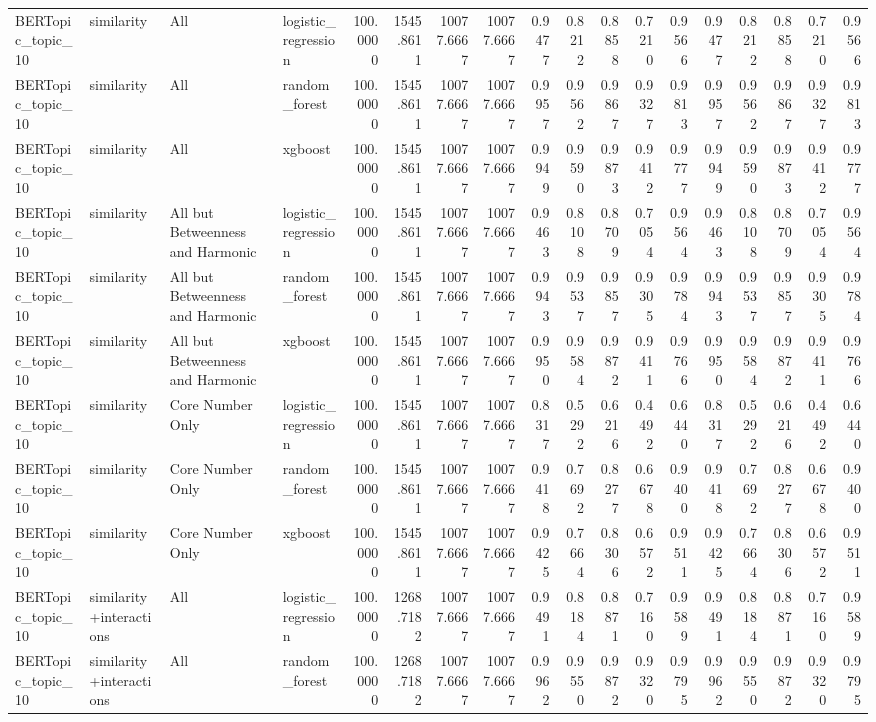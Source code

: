 \begin{tabular}{llllrrrrrrrrrrrrrr}
BERTopic_topic_10 & similarity & All & logistic_regression & 100.0000 & 1545.8611 & 10077.6667 & 10077.6667 & 0.9477 & 0.8212 & 0.8858 & 0.7210 & 0.9566 & 0.9477 & 0.8212 & 0.8858 & 0.7210 & 0.9566 \\
BERTopic_topic_10 & similarity & All & random_forest & 100.0000 & 1545.8611 & 10077.6667 & 10077.6667 & 0.9957 & 0.9562 & 0.9867 & 0.9327 & 0.9813 & 0.9957 & 0.9562 & 0.9867 & 0.9327 & 0.9813 \\
BERTopic_topic_10 & similarity & All & xgboost & 100.0000 & 1545.8611 & 10077.6667 & 10077.6667 & 0.9949 & 0.9590 & 0.9873 & 0.9412 & 0.9777 & 0.9949 & 0.9590 & 0.9873 & 0.9412 & 0.9777 \\
BERTopic_topic_10 & similarity & All but Betweenness and Harmonic & logistic_regression & 100.0000 & 1545.8611 & 10077.6667 & 10077.6667 & 0.9463 & 0.8108 & 0.8709 & 0.7054 & 0.9564 & 0.9463 & 0.8108 & 0.8709 & 0.7054 & 0.9564 \\
BERTopic_topic_10 & similarity & All but Betweenness and Harmonic & random_forest & 100.0000 & 1545.8611 & 10077.6667 & 10077.6667 & 0.9943 & 0.9537 & 0.9857 & 0.9305 & 0.9784 & 0.9943 & 0.9537 & 0.9857 & 0.9305 & 0.9784 \\
BERTopic_topic_10 & similarity & All but Betweenness and Harmonic & xgboost & 100.0000 & 1545.8611 & 10077.6667 & 10077.6667 & 0.9950 & 0.9584 & 0.9872 & 0.9411 & 0.9766 & 0.9950 & 0.9584 & 0.9872 & 0.9411 & 0.9766 \\
BERTopic_topic_10 & similarity & Core Number Only & logistic_regression & 100.0000 & 1545.8611 & 10077.6667 & 10077.6667 & 0.8317 & 0.5292 & 0.6216 & 0.4492 & 0.6440 & 0.8317 & 0.5292 & 0.6216 & 0.4492 & 0.6440 \\
BERTopic_topic_10 & similarity & Core Number Only & random_forest & 100.0000 & 1545.8611 & 10077.6667 & 10077.6667 & 0.9418 & 0.7692 & 0.8277 & 0.6678 & 0.9400 & 0.9418 & 0.7692 & 0.8277 & 0.6678 & 0.9400 \\
BERTopic_topic_10 & similarity & Core Number Only & xgboost & 100.0000 & 1545.8611 & 10077.6667 & 10077.6667 & 0.9425 & 0.7664 & 0.8306 & 0.6572 & 0.9511 & 0.9425 & 0.7664 & 0.8306 & 0.6572 & 0.9511 \\
BERTopic_topic_10 & similarity+interactions & All & logistic_regression & 100.0000 & 1268.7182 & 10077.6667 & 10077.6667 & 0.9491 & 0.8184 & 0.8871 & 0.7160 & 0.9589 & 0.9491 & 0.8184 & 0.8871 & 0.7160 & 0.9589 \\
BERTopic_topic_10 & similarity+interactions & All & random_forest & 100.0000 & 1268.7182 & 10077.6667 & 10077.6667 & 0.9962 & 0.9550 & 0.9872 & 0.9320 & 0.9795 & 0.9962 & 0.9550 & 0.9872 & 0.9320 & 0.9795 \\

\end{tabular}
